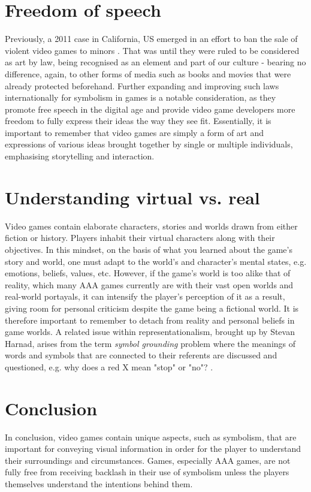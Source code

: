 \documentclass{scrartcl}
\begin{document}
\section{Freedom of speech}
Previously, a 2011 case in California, US emerged in an effort to ban the sale of violent video games to minors \cite{brownv}. That was until they were ruled to be considered as art by law, being recognised as an element and part of our culture - bearing no difference, again, to other forms of media such as books and movies that were already protected beforehand. Further expanding and improving such laws internationally for symbolism in games is a notable consideration, as they promote free speech in the digital age and provide video game developers more freedom to fully express their ideas the way they see fit. Essentially, it is important to remember that video games are simply a form of art and expressions of various ideas brought together by single or multiple individuals, emphasising storytelling and interaction.


\section{Understanding virtual vs. real}
Video games contain elaborate characters, stories and worlds drawn from either fiction or history. Players inhabit their virtual characters along with their objectives. In this mindset, on the basis of what you learned about the game's story and world, one must adapt to the world's and character's mental states, e.g. emotions, beliefs, values, etc. However, if the game's world is too alike that of reality, which many AAA games currently are with their vast open worlds and real-world portayals, it can intensify the player's perception of it as a result, giving room for personal criticism despite the game being a fictional world. It is therefore important to remember to detach from reality and personal beliefs in game worlds. A related issue within representationalism, brought up by Stevan Harnad, arises from the term \textit{symbol grounding} problem where the meanings of words and symbols that are connected to their referents are discussed and questioned, e.g. why does a red X mean "stop" or "no"? \cite{harnad} \cite{davidmyers}.


\section{Conclusion}
In conclusion, video games contain unique aspects, such as symbolism, that are important for conveying visual information in order for the player to understand their surroundings and circumstances. Games, especially AAA games, are not fully free from receiving backlash in their use of symbolism unless the players themselves understand the intentions behind them.





\end{document}
